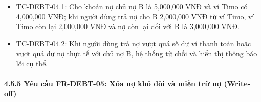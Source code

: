 \documentclass[11pt,a4paper]{article}
\providecommand{\tightlist}{
  \setlength{\itemsep}{0pt}\setlength{\parskip}{0pt}}
\begin{document}
\begin{itemize}
  \begin{itemize}
  \tightlist
  \item
    TC-DEBT-04.1: Cho khoản nợ chủ nợ B là 5,000,000 VNĐ và ví Timo có
    4,000,000 VNĐ; khi người dùng trả nợ cho B 2,000,000 VNĐ từ ví Timo,
    ví Timo còn lại 2,000,000 VNĐ và nợ còn lại đối với B là 3,000,000
    VNĐ.
  \item
    TC-DEBT-04.2: Khi người dùng trả nợ vượt quá số dư ví thanh toán
    hoặc vượt quá dư nợ thực tế với chủ nợ B, hệ thống từ chối và hiển
    thị thông báo lỗi cụ thể.
  \end{itemize}
\end{itemize}

\newpage

\paragraph{4.5.5 Yêu cầu FR-DEBT-05: Xóa nợ khó đòi và miễn trừ nợ
(Write-off)}\label{455-yuxeau-cux1ea7u-fr-debt-05-xuxf3a-nux1ee3-khuxf3-ux111uxf2i-vuxe0-miux1ec5n-trux1eeb-nux1ee3-write-off}
\end{document}
